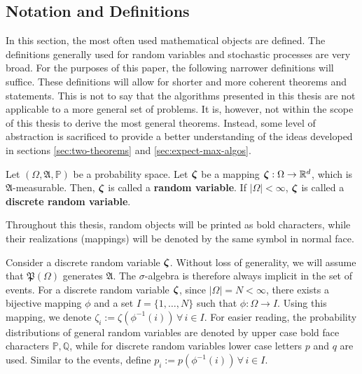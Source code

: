 \subsection{Notation and Definitions}
In this section, the most often used mathematical objects are defined.
The definitions generally used for random variables and stochastic processes are very broad.
For the purposes of this paper, the following narrower definitions will suffice.
These definitions will allow for shorter and more coherent theorems and statements.
This is not to say that the algorithms presented in this thesis are not applicable to a more general set of problems.
It is, however, not within the scope of this thesis to derive the most general theorems. Instead, some level of abstraction is sacrificed to provide a better understanding of the ideas developed in sections \ref{sec:two-theorems} and \ref{sec:expect-max-algos}.
\begin{definition}
  \label{def:random_variable}
  Let $(\Omega, \mathfrak{A}, \mathbb{P})$ be a probability space.
  Let $\boldsymbol\zeta$ be a mapping $\boldsymbol\zeta:\Omega\rightarrow\mathbb{R}^d$, which is $\mathfrak{A}$-measurable.
  Then, $\boldsymbol\zeta$ is called a \textbf{random variable}.
  If $|\Omega|<\infty$, $\boldsymbol\zeta$ is called a \textbf{discrete random variable}.
  \end{definition}
\begin{remark}
  Throughout this thesis, random objects will be printed as bold characters, while their realizations (mappings) will be denoted by the same symbol in normal face.
\end{remark}
\begin{remark}
  \label{remark:discrete-randvar-indexsets}
  Consider a discrete random variable $\boldsymbol\zeta$.
  Without loss of generality, we will assume that $\mathfrak{P}(\Omega)$ generates $\mathfrak{A}$.
  The $\sigma$-algebra is therefore always implicit in the set of events.
  For a discrete random variable $\boldsymbol\zeta$, since $|\Omega|=N<\infty$, there exists a bijective mapping $\phi$ and a set $I=\{1,\ldots, N\}$ such that $\phi:\Omega \rightarrow I$.
  Using this mapping, we denote $\zeta_i := \zeta(\phi^{-1}(i))\,\forall\,i\in I$.
  For easier reading, the probability distributions of general random variables are denoted by upper case bold face characters $\mathbb{P,Q}$, while for discrete random variables lower case letters $p$ and $q$ are used.
  Similar to the events, define $p_i := p(\phi^{-1}(i))\,\forall\,i\in I$.
\end{remark}

